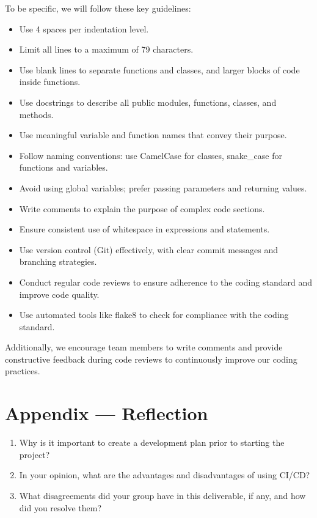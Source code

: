 \documentclass{article}
\begin{document}
To be specific, we will follow these key guidelines:
\begin{itemize}
  \item Use 4 spaces per indentation level.
  \item Limit all lines to a maximum of 79 characters.
  \item Use blank lines to separate functions and classes, and larger blocks of code inside functions.
  \item Use docstrings to describe all public modules, functions, classes, and methods.
  \item Use meaningful variable and function names that convey their purpose.
  \item Follow naming conventions: use CamelCase for classes, snake\_case for functions and variables.
  \item Avoid using global variables; prefer passing parameters and returning values.
  \item Write comments to explain the purpose of complex code sections.
  \item Ensure consistent use of whitespace in expressions and statements.
  \item Use version control (Git) effectively, with clear commit messages and branching strategies.
  \item Conduct regular code reviews to ensure adherence to the coding standard and improve code quality.
  \item Use automated tools like flake8 to check for compliance with the coding standard.
\end{itemize}

Additionally, we encourage team members to write comments and provide constructive feedback during code reviews
to continuously improve our coding practices.

\newpage{}

\section*{Appendix --- Reflection}


 

\begin{enumerate}
    \item Why is it important to create a development plan prior to starting the
    project?

    \item In your opinion, what are the advantages and disadvantages of using
    CI/CD?

    \item What disagreements did your group have in this deliverable, if any,
    and how did you resolve them?

\end{enumerate}
\end{document}
